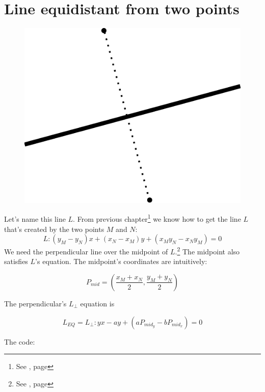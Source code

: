 \documentclass[12pt,openany,a4,usenames,dvipsnames]{book}
\begin{document}
\chapter{Line equidistant from two points}
\begin{figure}[H]
\centering
\includegraphics[height=8\baselineskip,keepaspectratio]{figures/equidistant.pdf}
\end{figure}
Let's name this line $L$. From previous chapter\footnote{See \emph{}, page \pageref{sec:linethroughtwopoints}} we know how to get the line $L$ that's created by the two points $M$ and $N$:
%
$$L: (y_M - y_N)x + (x_N-x_M)y+(x_{M}y_{N}-x_{N}y_{M})=0$$%
%
We need the perpendicular line over the midpoint of $L$.\footnote{See \emph{}, page \pageref{ch:perpendicular}} The midpoint also satisfies $L$'s equation. The midpoint's coordinates are intuitively:

$$P_{mid} = \left(\frac{x_M + x_N}{2}, \frac{y_M + y_N}{2}\right)$$

The perpendicular's $L_{⊥}$ equation is

$$L_{EQ} = L_{⊥}: yx-ay+\left(aP_{mid_y}-bP_{mid_x}\right)=0$$

\noindent{}The code:
\end{document}
